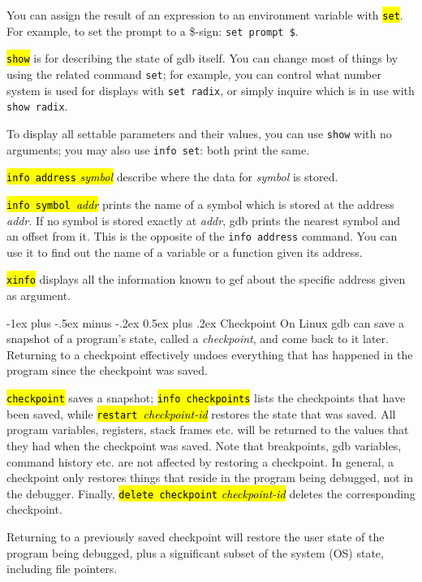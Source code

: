 \documentclass[a4paper,landscape]{article}
\makeatletter
\newcommand{\hlc}[2][yellow]{{\sethlcolor{#1} \hl{#2}}}
\newcommand{\gef}[1]{\hlc[skyblue]{#1}}
\renewcommand{\section}{\@startsection{section}{1}{0mm}%
                                {-1ex plus -.5ex minus -.2ex}%
                                {0.5ex plus .2ex}%
                                {\normalfont\large\bfseries}}
\makeatother
\begin{document}
\begin{multicols*}{3}
You can assign the result of an expression to an environment variable with \hl{\texttt{set}}.
For example, to set the prompt to a \$-sign: \texttt{set prompt \$}.

\hl{\texttt{show}} is for describing the state of gdb itself. You can
change most of things by using the related command \texttt{set};
for example, you can control what number system is used for displays with \texttt{set
radix}, or simply inquire which is in use with \texttt{show radix}.

To display all settable parameters and their values, you can use
\texttt{show} with no arguments; you may also use \texttt{info set}: both print the same.

\hl{\texttt{info address} \textit{symbol}} describe where the data for \textit{symbol} is stored.

\hl{\texttt{info symbol }\textit{addr}} prints
the name of a symbol which is stored at the address \textit{addr}. If no symbol
is stored exactly at \textit{addr}, gdb prints the nearest symbol and an offset from it.
This is the opposite of the \texttt{info address} command. You can use it to find out
the name of a variable or a function given its address.

\gef{\texttt{xinfo}} displays all the information known to gef about the specific address given as argument.

\section{Checkpoint}
On Linux gdb can save a snapshot of a program's state, called
a \emph{checkpoint}, and come back to it later.
Returning to a checkpoint effectively undoes everything that has happened in the program since the checkpoint was saved.

\hl{\texttt{checkpoint}} saves a snapshot;
\hl{\texttt{info checkpoints}} lists the checkpoints that have been saved,
while
\hl{\texttt{restart }\textit{checkpoint-id}} restores the state that was saved.
All program variables, registers, stack frames etc. will be returned to the values
that they had when the checkpoint was saved.
Note that breakpoints, gdb variables, command history etc. are not affected
by restoring a checkpoint. In general, a checkpoint only restores things that
reside in the program being debugged, not in the debugger.
Finally, \hl{\texttt{delete checkpoint}\textit{ checkpoint-id}} deletes the corresponding
checkpoint.

Returning to a previously saved checkpoint will restore the user state of the program
being debugged, plus a significant subset of the system (OS) state, including file pointers.


\end{multicols*}
\end{document}
